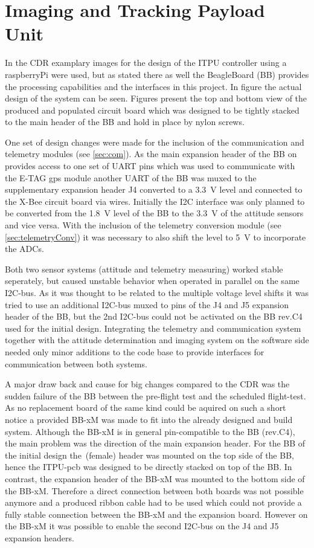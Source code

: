  
\section{Imaging and Tracking Payload Unit}

In the CDR examplary images for the design of the ITPU controller using a raspberryPi were used, but as stated there as well the BeagleBoard (BB) provides the processing capabilities and the interfaces in this project. In figure the actual design of the system can be seen. Figures present the top and bottom view of the produced and populated circuit board which was designed to be tightly stacked to the main header of the BB and hold in place by nylon screws.

One set of design changes were made for the inclusion of the communication and telemetry modules (see \ref{sec:com}). As the main expansion header of the BB on provides access to one set of UART pins which was used to communicate with the E-TAG gps module another UART of the BB was muxed to the supplementary expansion header J4 converted to a 3.3~V level and connected to the X-Bee circuit board via wires. Initially the I2C interface was only planned to be converted from the 1.8~V level of the BB to the 3.3~V of the attitude sensors and vice versa. With the inclusion of the telemetry conversion module (see \ref{sec:telemetryConv}) it was necessary to also shift the level to 5~V to incorporate the ADCs. 

Both two sensor systems (attitude and telemetry measuring) worked stable seperately, but caused unstable behavior when operated in parallel on the same I2C-bus. As it was thought to be related to the multiple voltage level shifts it was tried to use an additional I2C-bus muxed to pins of the J4 and J5 expansion header of the BB, but the 2nd I2C-bus could not be activated on the BB rev.C4 used for the initial design.
Integrating the telemetry and communication system together with the attitude determination and imaging system on the software side needed only minor additions to the code base to provide interfaces for communication between both systems. 

A major draw back and cause for big changes compared to the CDR was the sudden failure of the BB between the pre-flight test and the scheduled flight-test. As no replacement board of the same kind could be aquired on such a short notice a provided BB-xM was made to fit into the already designed and build system. Although the BB-xM is in general pin-compatible to the BB (rev.C4), the main problem was the direction of the main expansion header. For the BB of the initial design the~(female) header was mounted on the top side of the BB, hence the ITPU-pcb was designed to be directly stacked on top of the BB. In contrast, the expansion header of the BB-xM was mounted to the bottom side of the BB-xM. Therefore a direct connection between both boards was not possible anymore and a produced ribbon cable had to be used which could not provide a fully stable connection between the BB-xM and the expansion board. However on the BB-xM it was possible to enable the second I2C-bus on the J4 and J5 expansion headers.
